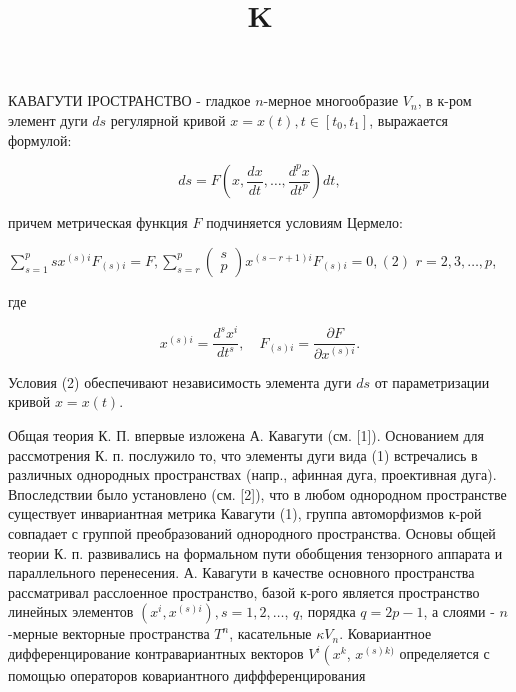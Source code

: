 \documentclass[10pt]{article}
\title{$\mathbf{K}$ }
\author{}
\date{}
\begin{document}
\maketitle

КАВАГУТИ ІРОСТРАНСТВО - гладкое $n$-мерное многообразие $V_{n}$, в к-ром элемент дуги $d s$ регулярной кривой $x=x(t), t \in\left[t_{0}, t_{1}\right]$, выражается формулой:



\[

d s=F\left(x, \frac{d x}{d t}, \ldots, \frac{d^{p} x}{d t^{p}}\right) d t,

\]



причем метрическая функция $F$ подчиняется условиям Цермело:



$\sum_{s=1}^{p} s x^{(s) i} F_{(s) i}=F, \sum_{s=r}^{p}\left(\begin{array}{l}s \\ p\end{array}\right) x^{(s-r+1) i} F_{(s) i}=0,(2)$ $r=2,3, \ldots, p$,



где



\[

x^{(s) i}=\frac{d^{s} x^{i}}{d t^{s}}, \quad F_{(s) i}=\frac{\partial F}{\partial x^{(s) i}} .

\]



Условия (2) обеспечивают независимость элемента дуги $d s$ от параметризации кривой $x=x(t)$.



Общая теория К. П. впервые изложена А. Кавагути (см. [1]). Основанием для рассмотрения К. п. послужило то, что элементы дуги вида (1) встречались в различных однородных пространствах (напр., афинная дуга, проективная дуга). Впоследствии было установлено (см. [2]), что в любом однородном пространстве существует инвариантная метрика Кавагути (1), группа автоморфизмов к-рой совпадает с группой преобразований однородного пространства. Основы общей теории К. п. развивались на формальном пути обобщения тензорного аппарата и параллельного перенесения. А. Кавагути в качестве основного пространства рассматривал расслоенное пространство, базой к-рого является пространство линейных элементов $\left(x^{i}, x^{(s) i}\right), s=1,2, \ldots$, $q$, порядка $q=2 p-1$, а слоями - $n$-мерные векторные пространства $T^{n}$, касательные $\kappa V_{n}$. Ковариантное дифференцирование контравариантных векторов $V^{i}\left(x^{k}\right.$, $x^{(s) k)}$ определяется с помощью операторов ковариантного диффференцирования
\end{document}
